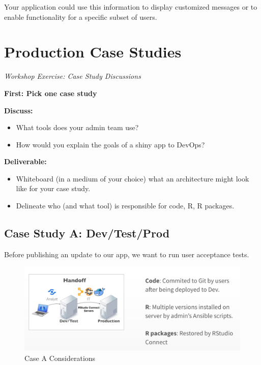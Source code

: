 \documentclass[]{book}
\providecommand{\tightlist}{%
  \setlength{\itemsep}{0pt}\setlength{\parskip}{0pt}}
\theoremstyle{definition}
\theoremstyle{definition}
\theoremstyle{definition}
\theoremstyle{remark}
\begin{document}
Your application could use this information to display customized
messages or to enable functionality for a specific subset of users.

\hypertarget{production-case-studies}{%
\chapter{Production Case Studies}\label{production-case-studies}}

\emph{Workshop Exercise: Case Study Discussions}

\textbf{First: Pick one case study}

\textbf{Discuss:}

\begin{itemize}
\tightlist
\item
  What tools does your admin team use?
\item
  How would you explain the goals of a shiny app to DevOps?
\end{itemize}

\textbf{Deliverable:}

\begin{itemize}
\tightlist
\item
  Whiteboard (in a medium of your choice) what an architecture might
  look like for your case study.
\item
  Delineate who (and what tool) is responsible for code, R, R packages.
\end{itemize}

\hypertarget{case-study-a-devtestprod}{%
\section{Case Study A: Dev/Test/Prod}\label{case-study-a-devtestprod}}

Before publishing an update to our app, we want to run user acceptance
tests.

\begin{figure}
\centering
\includegraphics{imgs/case-studies/case-a.png}
\caption{Case A Considerations}
\end{figure}
\end{document}
